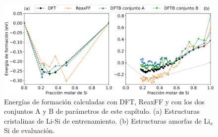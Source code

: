 \begin{figure}[h]
    \centering
    \includegraphics[width=\textwidth]{Silicio/modelo/resultados/formacion/energias.png}
    \caption{Energías de formación calculadas con DFT, ReaxFF y con los dos 
    conjuntos A y B de parámetros de este capítulo. (a) Estructuras cristalinas
    de Li-Si de entrenamiento. (b) Estructuras amorfas de Li$_x$Si de evaluación.}
    \label{fig:eform}
\end{figure}
